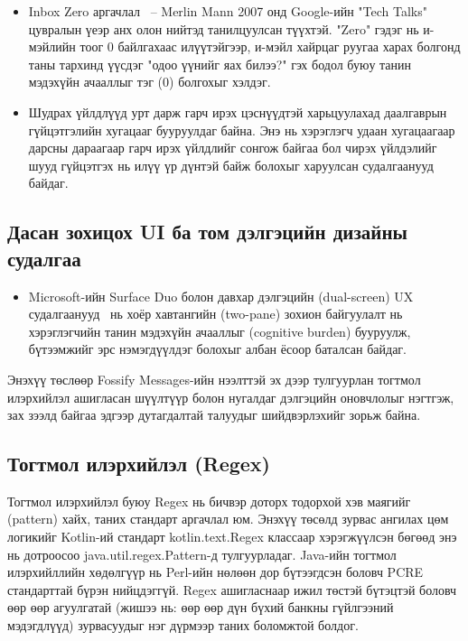 \begin{itemize}
    \item Inbox Zero аргачлал~\cite{mann2007inboxzero} – Merlin Mann 2007 онд Google-ийн "Tech Talks" цувралын үеэр анх олон нийтэд танилцуулсан түүхтэй.  "Zero" гэдэг нь и-мэйлийн тоог 0 байлгахаас илүүтэйгээр, и-мэйл хайрцаг руугаа харах болгонд таны тархинд үүсдэг "одоо үүнийг яах билээ?" гэх бодол буюу танин мэдэхүйн ачааллыг тэг (0) болгохыг хэлдэг.
    \item Шудрах үйлдлүүд урт дарж гарч ирэх цэснүүдтэй харьцуулахад даалгаврын гүйцэтгэлийн хугацааг бууруулдаг байна. Энэ нь хэрэглэгч удаан хугацаагаар дарсны дараагаар гарч ирэх үйлдлийг сонгож байгаа бол чирэх үйлдэлийг шууд гүйцэтгэх нь илүү үр дүнтэй байж болохыг харуулсан судалгаанууд~\cite{barkhuus2013longpress} байдаг.


\end{itemize}
\subsection{Дасан зохицох UI ба том дэлгэцийн дизайны судалгаа }
\begin{itemize}
    \item Microsoft-ийн Surface Duo болон давхар дэлгэцийн (dual-screen) UX судалгаанууд~\cite{friedman2020surfaceduo} нь хоёр хавтангийн (two-pane) зохион байгуулалт нь хэрэглэгчийн танин мэдэхүйн ачааллыг (cognitive burden) бууруулж, бүтээмжийг эрс нэмэгдүүлдэг болохыг албан ёсоор баталсан байдаг.

\end{itemize}

Энэхүү төслөөр Fossify Messages-ийн нээлттэй эх дээр тулгуурлан тогтмол илэрхийлэл ашигласан шүүлтүүр болон нугалдаг дэлгэцийн оновчлолыг нэгтгэж, зах зээлд байгаа эдгээр дутагдалтай талуудыг шийдвэрлэхийг зорьж байна.

\subsection{Тогтмол илэрхийлэл (Regex)}
Тогтмол илэрхийлэл буюу Regex нь бичвэр доторх тодорхой хэв маягийг (pattern) хайх, таних стандарт аргачлал юм. Энэхүү төсөлд зурвас ангилах цөм логикийг Kotlin-ий стандарт kotlin.text.Regex классаар хэрэгжүүлсэн бөгөөд энэ нь дотроосоо java.util.regex.Pattern-д тулгуурладаг. Java-ийн тогтмол илэрхийллийн хөдөлгүүр нь Perl-ийн нөлөөн дор бүтээгдсэн боловч PCRE стандарттай бүрэн нийцдэггүй. Regex ашигласнаар ижил төстэй бүтэцтэй боловч өөр өөр агуулгатай (жишээ нь: өөр өөр дүн бүхий банкны гүйлгээний мэдэгдлүүд) зурвасуудыг нэг дүрмээр таних боломжтой болдог.

